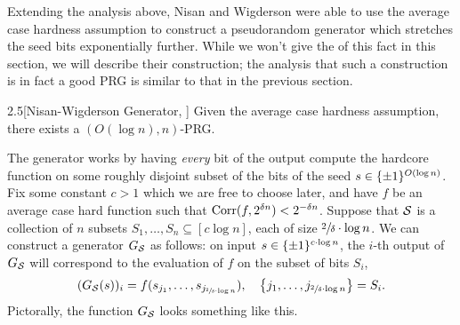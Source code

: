 \documentclass[11pt]{article}
\begin{document}
Extending the analysis above, Nisan and Wigderson were able to use the average case hardness assumption to construct a pseudorandom generator which stretches the seed bits exponentially further. While we won't give the of this fact in this section, we will describe their construction; the analysis that such a construction is in fact a good PRG is similar to that in the previous section.
\begin{theorem}{2.5}[Nisan-Wigderson Generator, \cite{NW94}]
    Given the average case hardness assumption, there exists a $(O(\log n), n)$-PRG.
\end{theorem}
\noindent
The generator works by having \emph{every} bit of the output compute the hardcore function on some roughly disjoint subset of the bits of the seed $s \in \{\pm 1\}^{O(\log n)}$. Fix some constant $c > 1$ which we are free to choose later, and have $f$ be an average case hard function such that $\mathrm{Corr}(f, 2^{\delta n}) < 2^{-\delta n}$. Suppose that $\mathcal{S}$ is a collection of $n$ subsets $S_1, \ldots, S_n \subseteq [c \log n]$, each of size $\sfrac{2}{\delta} \cdot \log n$. We can construct a generator $G_{\mathcal{S}}$ as follows: on input $s \in \{\pm 1\}^{c \cdot \log n}$, the $i$-th output of $G_{\mathcal{S}}$ will correspond to the evaluation of $f$ on the subset of bits $S_i$,
\begin{equation*}
    (G_{\mathcal{S}}(s))_{i} = f(s_{j_1}, \ldots, s_{j_{\sfrac{2}{\delta} \cdot \log n}}), \quad \left\{j_1, \ldots, j_{\sfrac{2}{\delta} \cdot \log n}\right\} = S_i.
\end{equation*}
Pictorally, the function $G_{\mathcal{S}}$ looks something like this.
\end{document}
